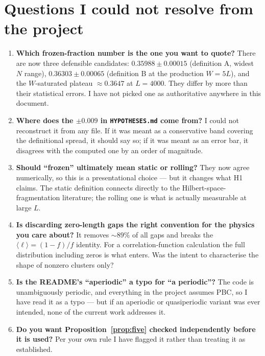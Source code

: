 \documentclass[11pt,a4paper]{article}
\begin{document}
\section{Questions I could not resolve from the project}

\begin{enumerate}
\item \textbf{Which frozen-fraction number is the one you want to quote?}
There are now three defensible candidates: $0.35988\pm0.00015$
(definition A, widest $N$ range), $0.36303\pm0.00065$ (definition B at the
production $W=5L$), and the $W$-saturated plateau $\approx0.3647$ at
$L=4000$. They differ by more than their statistical errors. I have not
picked one as authoritative anywhere in this document.

\item \textbf{Where does the $\pm0.009$ in \texttt{HYPOTHESES.md} come
from?} I could not reconstruct it from any file. If it was meant as a
conservative band covering the definitional spread, it should say so; if it
was meant as an error bar, it disagrees with the computed one by an order of
magnitude.

\item \textbf{Should ``frozen'' ultimately mean static or rolling?} They now
agree numerically, so this is a presentational choice --- but it changes what
H1 claims. The static definition connects directly to the
Hilbert-space-fragmentation literature; the rolling one is what is actually
measurable at large $L$.

\item \textbf{Is discarding zero-length gaps the right convention for the
physics you care about?} It removes ${\sim}89\%$ of all gaps and breaks the
$\langle\ell\rangle=(1-f)/f$ identity. For a correlation-function
calculation the full distribution including zeros is what enters. Was the
intent to characterise the shape of nonzero clusters only?

\item \textbf{Is the README's ``aperiodic'' a typo for ``a periodic''?} The
code is unambiguously periodic, and everything in the project assumes PBC,
so I have read it as a typo --- but if an aperiodic or quasiperiodic variant
was ever intended, none of the current work addresses it.

\item \textbf{Do you want Proposition~\ref{prop:five} checked
independently before it is used?} Per your own rule I have flagged it rather
than treating it as established.
\end{enumerate}
\end{document}

